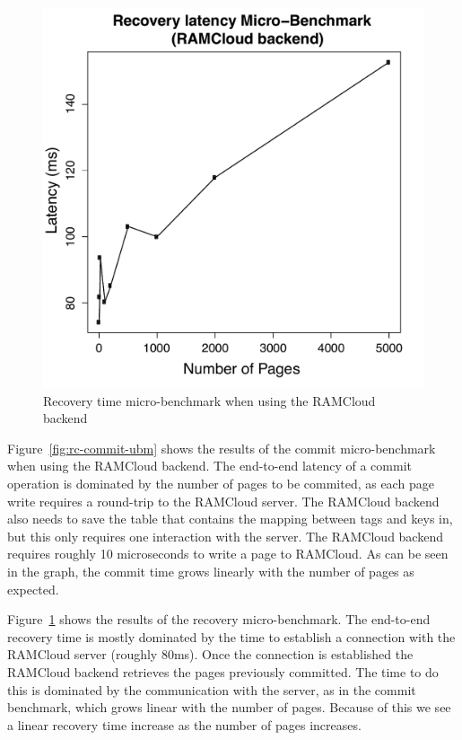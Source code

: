 \begin{figure}[t!]
\begin{center}
\includegraphics[scale=0.40]{graphs/recovery_time_rc_latencies.pdf}
\end{center}
\caption{Recovery time micro-benchmark when using the RAMCloud backend}
\label{fig:rc-recovery-ubm}
\end{figure}

Figure~\ref{fig:rc-commit-ubm} shows the results of the commit micro-benchmark when using the RAMCloud backend. 
The end-to-end latency of a commit operation is dominated by the number of pages to be commited, as each page write requires a round-trip to the RAMCloud server.
The RAMCloud backend also needs to save the table that contains the mapping between tags and keys in, but this only requires one interaction with the server.
The RAMCloud backend requires roughly 10 microseconds to write a page to RAMCloud. As can be seen in the graph, the commit time grows linearly with the number of pages as expected.

Figure~\ref{fig:rc-recovery-ubm} shows the results of the recovery micro-benchmark.
The end-to-end recovery time is mostly dominated by the time to establish a connection with the RAMCloud server (roughly 80ms).
Once the connection is established the RAMCloud backend retrieves the pages previously committed. The time to do this is dominated by the communication with the server, as in the commit benchmark, which grows linear with the number of pages.
Because of this we see a linear recovery time increase as the number of pages increases.
